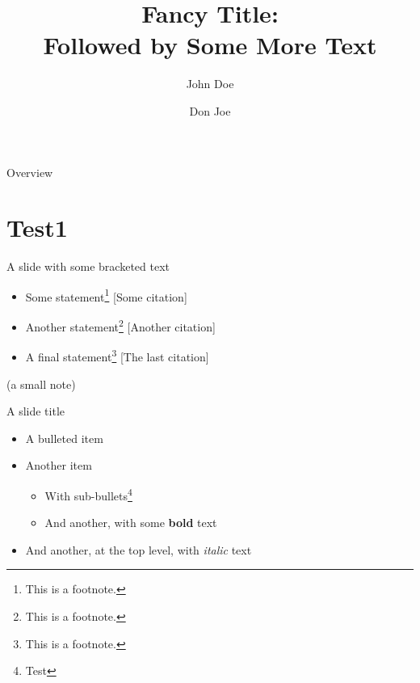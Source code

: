 \documentclass[12pt,aspectratio=169]{beamer}
\title{Fancy Title: \\ Followed by Some More Text}
\author{\name \inst{1} \and John Doe \inst{2} \and Don Joe \inst{2}}
\institute[shortinst]{\inst{1} \department \\ 
                      \inst{2} Another University, Another Department
}
\begin{document}
{
  \begin{frame}
    \titlepage
  \end{frame}
}

\begin{frame}{Overview}
    \tableofcontents
\end{frame}

\section{Test1}
\begin{frame}{A slide with some bracketed text}

	\begin{itemize}
		\item Some statement\footnote{This is a footnote.} {\color{gray} [Some citation]}
		\item Another statement\footnote{This is a footnote.} {\color{gray} [Another citation]}
		\item A final statement\footnote{This is a footnote.} {\color{gray} [The last citation]}
	\end{itemize}

	\vspace{3ex}
	\begin{center}
		\scriptsize (a small note)
	\end{center}

\end{frame}

\begin{frame}{A slide title}

  \begin{itemize}
    \item A bulleted item
    \item Another item
      \begin{itemize}
        \item With sub-bullets\footnote{Test}
        \item And another, with some \textbf{bold} text
      \end{itemize}
    \item And another, at the top level, with \textit{italic} text
  \end{itemize}

\end{frame}
\end{document}
